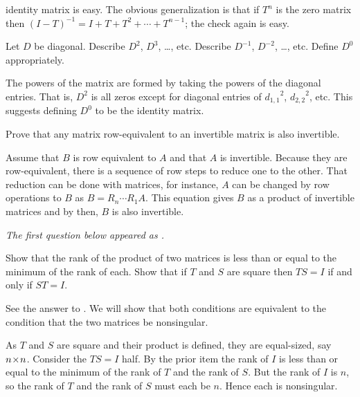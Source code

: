 \begin{exercises}
\begin{answer}
      identity matrix is easy.
      The obvious generalization is that if \( T^n \) is the zero matrix
      then \( (I-T)^{-1}=I+T+T^2+\cdots+T^{n-1} \); the check again is
      easy.  
    \end{answer}
  \recommended \item 
    Let \( D \) be diagonal.
    Describe \( D^2 \), \( D^3 \), \ldots\thinspace, etc.
    Describe \( D^{-1} \), \( D^{-2} \), \ldots\thinspace, etc.
    Define \( D^0 \) appropriately.
    \begin{answer}
      The powers of the matrix are formed by taking the powers of the
      diagonal entries.
      That is,  \( D^2 \) is all zeros except for diagonal entries of
      \( {d_{1,1}}^2 \), \( {d_{2,2}}^2 \), etc.
      This suggests defining \( D^0 \) to be the identity matrix.  
    \end{answer}
  \item
    Prove that any matrix row-equivalent to an invertible matrix is also
    invertible.
    \begin{answer}
      Assume that $B$ is row equivalent to $A$ and that $A$ is invertible.
      Because they are row-equivalent, there is a sequence of row steps 
      to reduce one to the other.
      That reduction can be done with matrices, for instance, $A$ can be
      changed by row operations to $B$ as $B=R_n\cdots R_1A$.
      This equation gives $B$ as a product of invertible matrices and
      by  then, $B$ is also invertible.  
    \end{answer}
  \item 
    \textit{The first question below appeared as
    .}
    \begin{exparts}
      \partsitem Show that the rank of the product of two matrices is less than
        or equal to the minimum of the rank of each.
      \partsitem Show that if \( T \)  and \( S \) are square then \( TS=I \)
         if and only if \( ST=I \).
    \end{exparts}
    \begin{answer}
      \begin{exparts}
        \partsitem See the answer to
          .
        \partsitem We will show that both conditions are equivalent to
          the condition that the two matrices be nonsingular. 

          As \( T \) and \( S \) are square and their product is defined,
          they are equal-sized, say \( n \! \times \! n \).
          Consider the \( TS=I \) half.
          By the prior item the rank of \( I \) is less than or equal to
          the minimum of the rank of \( T \) and the rank of \( S \).
          But the rank of \( I \) is \( n \), so the rank of \( T \) and
          the rank of \( S \) must each be \( n \).
          Hence each is nonsingular.


\end{exparts}
\end{answer}
\end{exercises}
